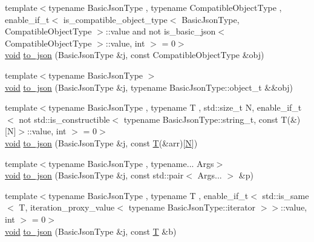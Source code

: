 \begin{DoxyCompactItemize}
\item 
{\footnotesize template$<$typename Basic\+Json\+Type , typename Compatible\+Object\+Type , enable\+\_\+if\+\_\+t$<$ is\+\_\+compatible\+\_\+object\+\_\+type$<$ Basic\+Json\+Type, Compatible\+Object\+Type $>$\+::value and not is\+\_\+basic\+\_\+json$<$ Compatible\+Object\+Type $>$\+::value, int $>$  = 0$>$ }\\\mbox{\hyperlink{namespacenlohmann_1_1detail_a59fca69799f6b9e366710cb9043aa77d}{void}} \mbox{\hyperlink{namespacenlohmann_1_1detail_a24c9c12f3839c94e09532f08de85e949}{to\+\_\+json}} (Basic\+Json\+Type \&j, const Compatible\+Object\+Type \&obj)
\item 
{\footnotesize template$<$typename Basic\+Json\+Type $>$ }\\\mbox{\hyperlink{namespacenlohmann_1_1detail_a59fca69799f6b9e366710cb9043aa77d}{void}} \mbox{\hyperlink{namespacenlohmann_1_1detail_ac9f7a5542851c61d93740148eaec509f}{to\+\_\+json}} (Basic\+Json\+Type \&j, typename Basic\+Json\+Type\+::object\+\_\+t \&\&obj)
\item 
{\footnotesize template$<$typename Basic\+Json\+Type , typename T , std\+::size\+\_\+t N, enable\+\_\+if\+\_\+t$<$ not std\+::is\+\_\+constructible$<$ typename Basic\+Json\+Type\+::string\+\_\+t, const T(\&)\mbox{[}\+N\mbox{]}$>$\+::value, int $>$  = 0$>$ }\\\mbox{\hyperlink{namespacenlohmann_1_1detail_a59fca69799f6b9e366710cb9043aa77d}{void}} \mbox{\hyperlink{namespacenlohmann_1_1detail_a20ea5175c8999fc8b673e46b892f71f6}{to\+\_\+json}} (Basic\+Json\+Type \&j, const \mbox{\hyperlink{_keyboard_event_8h_adf1f3edb9115acb0a1e04209b7a9937b}{T}}(\&arr)\mbox{[}\mbox{\hyperlink{_keyboard_event_8h_a8cc2e7240164328fdc3f0e5e21032c56}{N}}\mbox{]})
\item 
{\footnotesize template$<$typename Basic\+Json\+Type , typename... Args$>$ }\\\mbox{\hyperlink{namespacenlohmann_1_1detail_a59fca69799f6b9e366710cb9043aa77d}{void}} \mbox{\hyperlink{namespacenlohmann_1_1detail_aa30611f74062379d3420c40487cf3bb3}{to\+\_\+json}} (Basic\+Json\+Type \&j, const std\+::pair$<$ Args... $>$ \&p)
\item 
{\footnotesize template$<$typename Basic\+Json\+Type , typename T , enable\+\_\+if\+\_\+t$<$ std\+::is\+\_\+same$<$ T, iteration\+\_\+proxy\+\_\+value$<$ typename Basic\+Json\+Type\+::iterator $>$$>$\+::value, int $>$  = 0$>$ }\\\mbox{\hyperlink{namespacenlohmann_1_1detail_a59fca69799f6b9e366710cb9043aa77d}{void}} \mbox{\hyperlink{namespacenlohmann_1_1detail_aaa77b0c9745130b77733a92a1a2e82ec}{to\+\_\+json}} (Basic\+Json\+Type \&j, const \mbox{\hyperlink{_keyboard_event_8h_adf1f3edb9115acb0a1e04209b7a9937b}{T}} \&b)

\end{DoxyCompactItemize}
